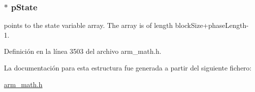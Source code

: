 \subsubsection[{\texorpdfstring{p\+State}{pState}}]{$\ast$ p\+State}\hypertarget{structarm__fir__interpolate__instance__q15_ae29dfdb736374fcddaeaec4b7770170c}{}\label{structarm__fir__interpolate__instance__q15_ae29dfdb736374fcddaeaec4b7770170c}
points to the state variable array. The array is of length block\+Size+phase\+Length-\/1. 

Definición en la línea 3503 del archivo arm\+\_\+math.\+h.



La documentación para esta estructura fue generada a partir del siguiente fichero\+:\begin{DoxyCompactItemize}
\item 
\hyperlink{arm__math_8h}{arm\+\_\+math.\+h}\end{DoxyCompactItemize}
